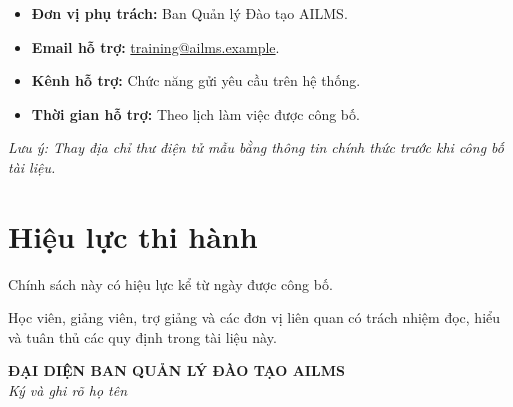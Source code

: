 \documentclass[12pt,a4paper]{article}
\begin{document}
\begin{itemize}
    \item \textbf{Đơn vị phụ trách:} Ban Quản lý Đào tạo AILMS.
    \item \textbf{Email hỗ trợ:}
    \href{mailto:training@ailms.example}{training@ailms.example}.
    \item \textbf{Kênh hỗ trợ:} Chức năng gửi yêu cầu trên hệ thống.
    \item \textbf{Thời gian hỗ trợ:} Theo lịch làm việc được công bố.
\end{itemize}

\textcolor{ailmsred}{
\textit{Lưu ý: Thay địa chỉ thư điện tử mẫu bằng thông tin chính thức
trước khi công bố tài liệu.}
}

\section{Hiệu lực thi hành}

Chính sách này có hiệu lực kể từ ngày được công bố.

Học viên, giảng viên, trợ giảng và các đơn vị liên quan có trách nhiệm
đọc, hiểu và tuân thủ các quy định trong tài liệu này.

\vfill

\begin{center}
    \textbf{ĐẠI DIỆN BAN QUẢN LÝ ĐÀO TẠO AILMS}\\[1.5cm]
    \textit{Ký và ghi rõ họ tên}
\end{center}
\end{document}
